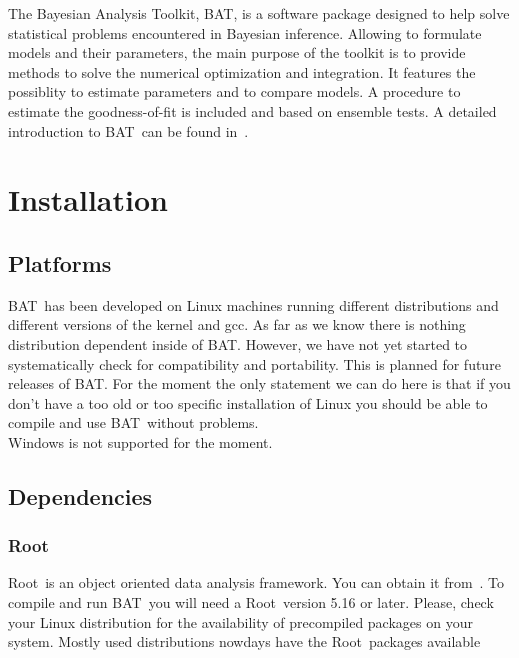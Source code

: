 \documentclass[11pt, a4paper]{article}
\newcommand{\bat}{{\sc BAT}}
\newcommand{\Root}{{\sc Root}}
\begin{document}
The Bayesian Analysis Toolkit, \bat, is a software package designed to
help solve statistical problems encountered in Bayesian
inference. Allowing to formulate models and their parameters, the main
purpose of the toolkit is to provide methods to solve the numerical
optimization and integration. It features the possiblity to estimate
parameters and to compare models. A procedure to estimate the
goodness-of-fit is included and based on ensemble tests. A detailed
introduction to \bat\ can be found in~\cite{Caldwell:2008fw}.


\section{Installation}
\label{section:installation}

\subsection{Platforms}

\bat\ has been developed on Linux machines running different distributions
and different versions of the kernel and gcc. As far as we know there
is nothing distribution dependent inside of \bat. However, we have not
yet started to systematically check for compatibility and
portability. This is planned for future releases of \bat. For the
moment the only statement we can do here is that if you don't have a
too old or too specific installation of Linux you should be able to
compile and use \bat\ without problems. \\ 

Windows is not supported for the moment. 


\subsection{Dependencies}

\subsubsection{\Root} 
\Root\ is an object oriented data analysis framework. You can obtain it
from~\cite{ROOTweb}. To compile and run \bat\ you will need a \Root\
version 5.16 or later. Please, check your Linux distribution for the
availability of precompiled packages on your system. Mostly used
distributions nowdays have the \Root\ packages available
\end{document}
